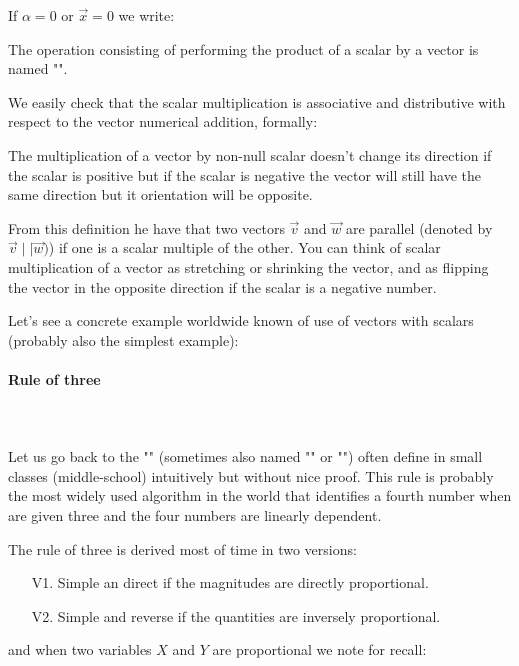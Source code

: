 If $\alpha=0$ or $\vec{x}=0$ we write:
	
The operation consisting of performing the product of a scalar by a vector is named "".

We easily check that the scalar multiplication is associative and distributive with respect to the vector numerical addition, formally:
	

	The multiplication of a vector by non-null scalar doesn't change its direction if the scalar is positive but if the scalar is negative the vector will still have the same direction but it orientation will be opposite.
	
	From this definition he have that two vectors $\vec{v}$ and $\vec{w}$ are parallel (denoted by $\vec{v}\mid\mid\vec{w})$) if one is a scalar multiple of the other. You can think of scalar multiplication of a vector as stretching or shrinking the vector, and as flipping the vector in the opposite direction if the scalar is a negative number.
	
	
	Let's see a concrete example worldwide known of use of vectors with scalars (probably also the simplest example):
	
	\paragraph{Rule of three}\mbox{}\\\\
	Let us go back to the "" (sometimes also named "" or "") often define in small classes (middle-school) intuitively but without nice proof. This rule is probably the most widely used algorithm in the world that identifies a fourth number when are given three and the four numbers are linearly dependent.

The rule of three is derived most of time in two versions:
	\begin{enumerate}
		\item[V1.] Simple an direct if the magnitudes are directly proportional.
		\item[V2.] Simple and reverse if the quantities are inversely proportional.
	\end{enumerate}
and when two variables $X$ and $Y$ are proportional we note for recall:
	
